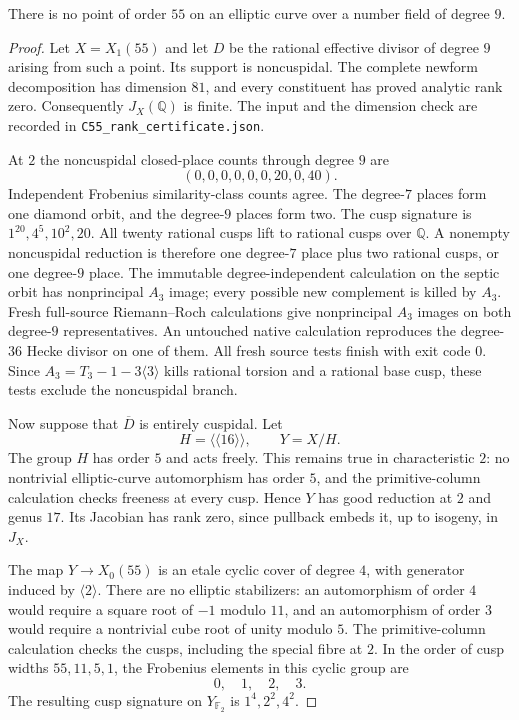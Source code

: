 \begin{proposition}\label{prop:nonic-C55}
There is no point of order $55$ on an elliptic curve over a number field
of degree $9$.
\end{proposition}
\begin{proof}
Let $X=X_1(55)$ and let $D$ be the rational effective divisor of degree
$9$ arising from such a point. Its support is noncuspidal. The complete
newform decomposition has dimension $81$, and every constituent has
proved analytic rank zero. Consequently $J_X(\mathbb Q)$ is finite.
The input and the dimension check are recorded in
\texttt{C55\_rank\_certificate.json}.

At $2$ the noncuspidal closed-place counts through degree $9$ are
\[
 (0,0,0,0,0,0,20,0,40).
\]
Independent Frobenius similarity-class counts agree. The degree-$7$
places form one diamond orbit, and the degree-$9$ places form two.
The cusp signature is $1^{20},4^5,10^2,20$.
All twenty rational cusps lift to rational cusps over $\mathbb Q$.
A nonempty noncuspidal reduction is therefore one degree-$7$ place
plus two rational cusps, or one degree-$9$ place.
The immutable degree-independent calculation on the septic orbit
has nonprincipal $A_3$ image; every possible new complement is killed
by $A_3$. Fresh full-source Riemann--Roch calculations give
nonprincipal $A_3$ images on both degree-$9$ representatives.
An untouched native calculation reproduces the degree-$36$ Hecke
divisor on one of them. All fresh source tests finish with exit code $0$.
Since $A_3=T_3-1-3\langle3\rangle$ kills rational torsion and a rational
base cusp, these tests exclude the noncuspidal branch.

Now suppose that $\overline D$ is entirely cuspidal. Let
\[
 H=\langle\langle16\rangle\rangle,\qquad Y=X/H.
\]
The group $H$ has order $5$ and acts freely. This remains true in
characteristic $2$: no nontrivial elliptic-curve automorphism has order
$5$, and the primitive-column calculation checks freeness at every
cusp. Hence $Y$ has good reduction at $2$ and genus $17$.
Its Jacobian has rank zero, since pullback embeds it, up to isogeny,
in $J_X$.

The map $Y\longrightarrow X_0(55)$ is an etale cyclic cover of degree
$4$, with generator induced by $\langle2\rangle$. There are no
elliptic stabilizers: an automorphism of order $4$ would require a
square root of $-1$ modulo $11$, and an automorphism of order $3$
would require a nontrivial cube root of unity modulo $5$. The
primitive-column calculation checks the cusps, including the special
fibre at $2$. In the order of cusp widths $55,11,5,1$, the Frobenius
elements in this cyclic group are
\[
 0,\quad1,\quad2,\quad3.
\]
The resulting cusp signature on $Y_{\mathbb F_2}$ is
$1^4,2^2,4^2$.


\end{proof}
